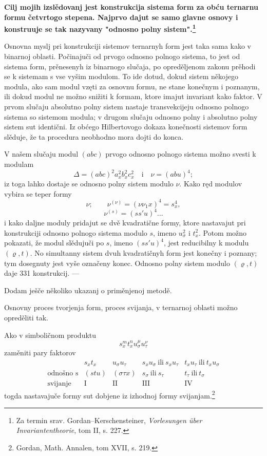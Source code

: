 \documentclass[11pt]{article}
\begin{document}
\textbf{Cilj mojih izslědovanj jest konstrukcija sistema form za obću ternarnu formu četvrtogo stepena. Najprvo dajut se samo glavne osnovy i konstruuje se tak nazyvany "odnosno polny sistem".\footnote{Za termin srav. Gordan--Kerschensteiner, \emph{Vorlesungen über Invariantentheorie}, tom II, s. 227.}}

Osnovna myslj pri konstrukciji sistemov ternarnyh form jest taka sama kako v binarnoj oblasti. Počinajuči od prvogo odnosno polnogo sistema, to jest od sistema form, prěnesenyh iz binarnogo slučaja, po opreděljenom zakonu prěhodi se k sistemam s vse vyšim modulom. To ide dotud, dokud sistem někojego modula, ako sam modul vzęti za osnovnu formu, ne stane konečnym i poznanym, ili dokud modul ne možno snižiti k formam, ktore imajut invariant kako faktor. V prvom slučaju absolutno polny sistem nastaje transvekcijeju odnosno polnogo sistema so sistemom modula; v drugom slučaju odnosno polny i absolutno polny sistem sut identični. Iz obćego Hilbertovogo dokaza konečnosti sistemov form slěduje, že ta procedura neobhodno mora dojti do konca.

V našem slučaju modul $(abc)$ prvogo odnosno polnogo sistema možno svesti k modulam
\[
\Delta=(abc)^2a_x^2b_x^2c_x^2\quad\text{i}\quad \nu=(abu)^4;
\]
iz toga lahko dostaje se odnosno polny sistem modulo $\nu$. Kako ręd modulov vybira se teper formy
\[
\nu;\qquad \nu^{(\nu)}=(\nu\nu_1x)^4=s_x^4,
\]
\[
\nu^{(s)}=(ss'u)^4\ldots
\]
i kako daljne moduly pridajut se dvě kvadratične formy, ktore nastavajut pri konstrukciji odnosno polnogo sistema modulo $s$, imeno $u_\sigma^2$ i $t_x^2$. Potom možno pokazati, že modul slědujuči po $s$, imeno $(ss'u)^4$, jest reducibilny k modulu $(\varrho,t)$. No simultanny sistem dvuh kvadratičnyh form jest konečny i poznany; tym dosegnuty jest vyše označeny konec. Odnosno polny sistem modulo $(\varrho,t)$ daje 331 konstrukcij. ---

Dodam ješče několiko ukazanj o priměnjenoj metodě.

Osnovny proces tvorjenja form, proces svijanja, v ternarnoj oblasti možno opreděliti tak.

Ako v simboličnom produktu
\[
s_x^m t_x^n u_\sigma^\mu u_\tau^\nu
\]
zaměniti pary faktorov
\[
\begin{array}{c|c|c|c|c}
 & s_xt_x & u_\sigma u_\tau & s_xu_\sigma\ \text{ili}\ s_xu_\tau & t_xu_\tau\ \text{ili}\ t_xu_\sigma\\
\text{odnošno s} & (stu) & (\sigma\tau x) & s_\sigma\ \text{ili}\ s_\tau & t_\tau\ \text{ili}\ t_\sigma\\
\text{svijanje} & \mathrm{I} & \mathrm{II} & \mathrm{III} & \mathrm{IV}
\end{array}
\]
togda nastavajuče formy sut dobjene iz izhodnoj formy svijanjam.\footnote{Gordan, Math. Annalen, tom XVII, s. 219.}
\end{document}
